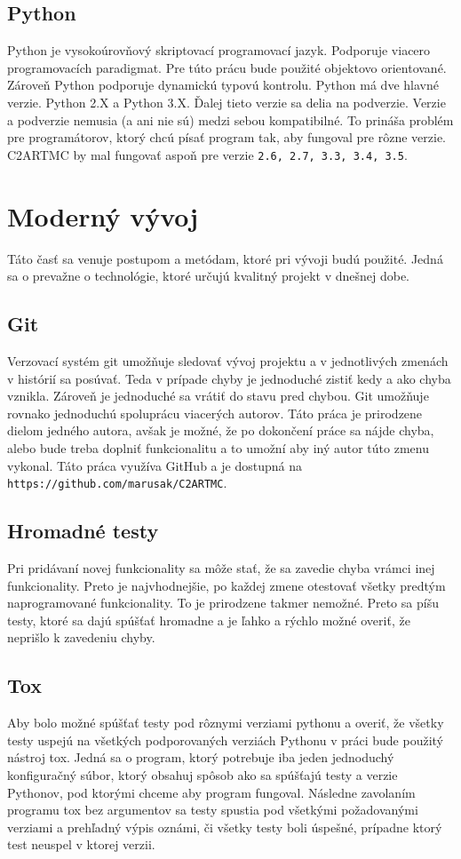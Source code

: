 \subsection{Python}
\label{subsec_python}
Python je vysokoúrovňový skriptovací programovací jazyk. Podporuje viacero programovacích
paradigmat. Pre túto prácu bude použité objektovo orientované. Zároveň Python podporuje
dynamickú typovú kontrolu.
Python má dve hlavné verzie. Python 2.X a Python 3.X. Ďalej tieto verzie sa delia na podverzie.
Verzie a podverzie nemusia (a ani nie sú) medzi sebou kompatibilné. To prináša problém
pre programátorov, ktorý chcú písať program tak, aby fungoval pre rôzne verzie.
C2ARTMC by mal fungovať aspoň pre verzie \texttt{2.6, 2.7, 3.3, 3.4, 3.5}.

\section{Moderný vývoj}
Táto časť sa venuje postupom a metódam, ktoré pri vývoji budú použité. Jedná sa
o prevažne o technológie, ktoré určujú kvalitný projekt v dnešnej dobe.

\subsection{Git}
Verzovací systém git umožňuje sledovať vývoj projektu a v jednotlivých zmenách
v histórií sa posúvať. Teda v prípade chyby je jednoduché zistiť kedy a ako chyba
vznikla. Zároveň je jednoduché sa vrátiť do stavu pred chybou.
Git umožňuje rovnako jednoduchú spoluprácu viacerých autorov. Táto práca je
prirodzene dielom jedného autora, avšak je možné, že po dokončení práce sa nájde
chyba, alebo bude treba doplniť funkcionalitu a to umožní aby iný autor túto zmenu
vykonal.
Táto práca využíva GitHub a je dostupná na \texttt{https://github.com/marusak/C2ARTMC}.

\subsection{Hromadné testy}
Pri pridávaní novej funkcionality sa môže stať, že sa zavedie chyba vrámci inej
funkcionality. Preto je najvhodnejšie, po každej zmene otestovať všetky predtým
naprogramované funkcionality. To je prirodzene takmer nemožné. Preto sa píšu testy,
ktoré sa dajú spúšťať hromadne a je ľahko a rýchlo možné overiť, že neprišlo k
zavedeniu chyby.

\subsection{Tox}
\label{sec_tox}
Aby bolo možné spúšťať testy pod rôznymi verziami pythonu a overiť, že všetky testy
uspejú na všetkých podporovaných verziách Pythonu v práci bude použitý nástroj tox.
Jedná sa o program, ktorý potrebuje iba jeden jednoduchý konfiguračný súbor, ktorý
obsahuj spôsob ako sa spúšťajú testy a verzie Pythonov, pod ktorými chceme
aby program fungoval. Následne zavolaním programu tox bez argumentov sa testy
spustia pod všetkými požadovanými verziami a prehľadný výpis oznámi, či všetky
testy boli úspešné, prípadne ktorý test neuspel v ktorej verzii.


